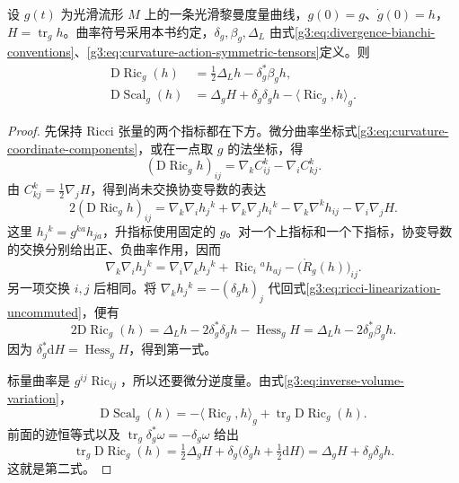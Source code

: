 \begin{theorem}\label{g3:thm:ricci-scalar-linearization}
	设 \(g(t)\) 为光滑流形 \(M\) 上的一条光滑黎曼度量曲线，\(g(0)=g\)、\(\dot g(0)=h\)，\(H=\operatorname{tr}_g h\)。曲率符号采用本书约定，\(\delta_g,\beta_g,\Delta_L\) 由式\eqref{g3:eq:divergence-bianchi-conventions}、\eqref{g3:eq:curvature-action-symmetric-tensors}定义。则
	\begin{align}
		\mathrm D\operatorname{Ric}_g(h)&=\frac12\Delta_Lh-\delta_g^*\beta_g h,\label{g3:eq:ricci-linearization}\\
		\mathrm D\operatorname{Scal}_g(h)&=\Delta_gH+\delta_g\delta_g h-\langle\operatorname{Ric}_g,h\rangle_g.\label{g3:eq:scalar-linearization}
	\end{align}
\end{theorem}
\begin{proof}
	先保持 Ricci 张量的两个指标都在下方。微分曲率坐标式\eqref{g3:eq:curvature-coordinate-components}，或在一点取 \(g\) 的法坐标，得
	\[
		(\mathrm D\operatorname{Ric}_g h)_{ij}=\nabla_k C^k_{ij}-\nabla_i C^k_{kj}.
	\]
	由 \(C^k_{kj}=\tfrac12\nabla_jH\)，得到尚未交换协变导数的表达
	\begin{equation}\label{g3:eq:ricci-linearization-uncommuted}
		2(\mathrm D\operatorname{Ric}_g h)_{ij}
		=\nabla_k\nabla_i h_j{}^k+\nabla_k\nabla_j h_i{}^k-\nabla_k\nabla^k h_{ij}-\nabla_i\nabla_jH.
	\end{equation}
	这里 \(h_j{}^k=g^{ka}h_{ja}\)，升指标使用固定的 \(g\)。对一个上指标和一个下指标，协变导数的交换分别给出正、负曲率作用，因而
	\[
		\nabla_k\nabla_i h_j{}^k
		=\nabla_i\nabla_k h_j{}^k+\operatorname{Ric}_i{}^a h_{aj}-\bigl(\mathring R_g(h)\bigr)_{ij}.
	\]
	另一项交换 \(i,j\) 后相同。将 \(\nabla_kh_j{}^k=-(\delta_gh)_j\) 代回式\eqref{g3:eq:ricci-linearization-uncommuted}，便有
	\[
		2\mathrm D\operatorname{Ric}_g(h)
		=\Delta_Lh-2\delta_g^*\delta_gh-\operatorname{Hess}_gH
		=\Delta_Lh-2\delta_g^*\beta_gh.
	\]
	因为 \(\delta_g^*\mathrm dH=\operatorname{Hess}_gH\)，得到第一式。

	标量曲率是 \(g^{ij}\operatorname{Ric}_{ij}\)，所以还要微分逆度量。由式\eqref{g3:eq:inverse-volume-variation}，
	\[
		\mathrm D\operatorname{Scal}_g(h)
		=-\langle\operatorname{Ric}_g,h\rangle_g+\operatorname{tr}_g\mathrm D\operatorname{Ric}_g(h).
	\]
	前面的迹恒等式以及 \(\operatorname{tr}_g\delta_g^*\omega=-\delta_g\omega\) 给出
	\[
		\operatorname{tr}_g\mathrm D\operatorname{Ric}_g(h)
		=\tfrac12\Delta_gH+\delta_g\bigl(\delta_gh+\tfrac12\mathrm dH\bigr)
		=\Delta_gH+\delta_g\delta_gh.
	\]
	这就是第二式。
\end{proof}

